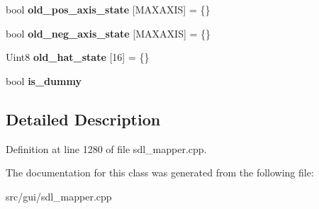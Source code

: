 \begin{DoxyCompactItemize}
\item 
\hypertarget{classCStickBindGroup_a283b8cbb49f54ad309ac461d31fcb8f3}{bool {\bfseries old\-\_\-pos\-\_\-axis\-\_\-state} \mbox{[}M\-A\-X\-A\-X\-I\-S\mbox{]} = \{\}}\label{classCStickBindGroup_a283b8cbb49f54ad309ac461d31fcb8f3}

\item 
\hypertarget{classCStickBindGroup_abf4f7de4055e1e6a70016a6830a39128}{bool {\bfseries old\-\_\-neg\-\_\-axis\-\_\-state} \mbox{[}M\-A\-X\-A\-X\-I\-S\mbox{]} = \{\}}\label{classCStickBindGroup_abf4f7de4055e1e6a70016a6830a39128}

\item 
\hypertarget{classCStickBindGroup_a19df3fcb72315b312752da5a66676dc3}{Uint8 {\bfseries old\-\_\-hat\-\_\-state} \mbox{[}16\mbox{]} = \{\}}\label{classCStickBindGroup_a19df3fcb72315b312752da5a66676dc3}

\item 
\hypertarget{classCStickBindGroup_a23c7e557c5ce9b73c62321e8c1504abc}{bool {\bfseries is\-\_\-dummy}}\label{classCStickBindGroup_a23c7e557c5ce9b73c62321e8c1504abc}

\end{DoxyCompactItemize}


\subsection{Detailed Description}


Definition at line 1280 of file sdl\-\_\-mapper.\-cpp.



The documentation for this class was generated from the following file\-:\begin{DoxyCompactItemize}
\item 
src/gui/sdl\-\_\-mapper.\-cpp\end{DoxyCompactItemize}
